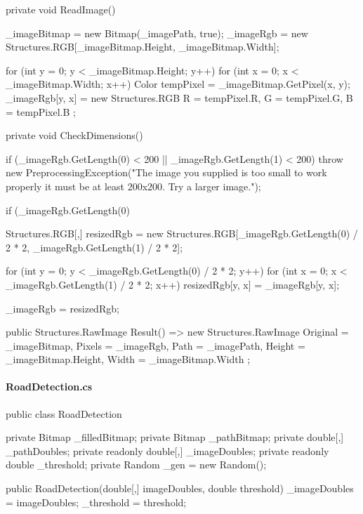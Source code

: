 \begin{flushleft}
\begin{cscode}
{    private void ReadImage()
    {
        _imageBitmap = new Bitmap(_imagePath, true);
        _imageRgb = new Structures.RGB[_imageBitmap.Height, _imageBitmap.Width];
    
        for (int y = 0; y < _imageBitmap.Height; y++)
        {
            for (int x = 0; x < _imageBitmap.Width; x++)
            {
                Color tempPixel = _imageBitmap.GetPixel(x, y);
                _imageRgb[y, x] = new Structures.RGB
                {
                    R = tempPixel.R,
                    G = tempPixel.G,
                    B = tempPixel.B
                };
            }
        }
    }
    
    private void CheckDimensions()
    {
        if (_imageRgb.GetLength(0) < 200 || _imageRgb.GetLength(1) < 200)
            throw new PreprocessingException("The image you supplied is too small to work properly it must be at least 200x200. Try a larger image.");
    
        if (_imageRgb.GetLength(0) %
        {
            Structures.RGB[,] resizedRgb =
                new Structures.RGB[_imageRgb.GetLength(0) / 2 * 2, _imageRgb.GetLength(1) / 2 * 2];
    
            for (int y = 0; y < _imageRgb.GetLength(0) / 2 * 2; y++)
            {
                for (int x = 0; x < _imageRgb.GetLength(1) / 2 * 2; x++)
                {
                    resizedRgb[y, x] = _imageRgb[y, x];
                }
            }
    
            _imageRgb = resizedRgb;
        }
    }
    
    public Structures.RawImage Result() => new Structures.RawImage
    {
        Original = _imageBitmap,
        Pixels = _imageRgb,
        Path = _imagePath,
        Height = _imageBitmap.Height,
        Width = _imageBitmap.Width
    };
}
    \end{cscode}
\pagebreak
    
    \paragraph{RoadDetection.cs}
    \begin{cscode}
public class RoadDetection
{
    private Bitmap _filledBitmap;
    private Bitmap _pathBitmap;
    private double[,] _pathDoubles;
    private readonly double[,] _imageDoubles;
    private readonly double _threshold;
    private Random _gen = new Random();

    public RoadDetection(double[,] imageDoubles, double threshold)
    {
        _imageDoubles = imageDoubles;
        _threshold = threshold;
    }

}
\end{cscode}
\end{flushleft}

